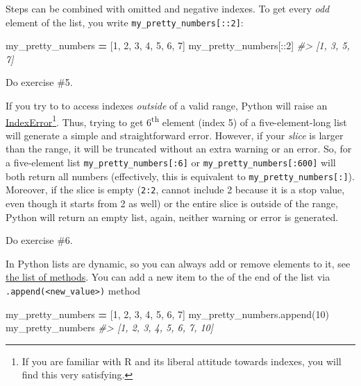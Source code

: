 \documentclass[
]{book}
\newenvironment{Shaded}{\begin{snugshade}}{\end{snugshade}}
\newcommand{\CommentTok}[1]{\textcolor[rgb]{0.56,0.35,0.01}{\textit{#1}}}
\newcommand{\DecValTok}[1]{\textcolor[rgb]{0.00,0.00,0.81}{#1}}
\newcommand{\NormalTok}[1]{#1}
\newcommand{\OperatorTok}[1]{\textcolor[rgb]{0.81,0.36,0.00}{\textbf{#1}}}
\begin{document}
Steps can be combined with omitted and negative indexes. To get every \emph{odd} element of the list, you write \texttt{my\_pretty\_numbers{[}::2{]}}:

\begin{Shaded}
\begin{Highlighting}[]
\NormalTok{my\_pretty\_numbers }\OperatorTok{=}\NormalTok{ [}\DecValTok{1}\NormalTok{, }\DecValTok{2}\NormalTok{, }\DecValTok{3}\NormalTok{, }\DecValTok{4}\NormalTok{, }\DecValTok{5}\NormalTok{, }\DecValTok{6}\NormalTok{, }\DecValTok{7}\NormalTok{]}
\NormalTok{my\_pretty\_numbers[::}\DecValTok{2}\NormalTok{]}
\CommentTok{\#\textgreater{} [1, 3, 5, 7]}
\end{Highlighting}
\end{Shaded}

Do exercise \#5.

If you try to to access indexes \emph{outside} of a valid range, Python will raise an \href{https://docs.python.org/3/library/exceptions.html\#IndexError}{IndexError}\footnote{If you are familiar with R and its liberal attitude towards indexes, you will find this very satisfying.}. Thus, trying to get 6\textsuperscript{th} element (index 5) of a five-element-long list will generate a simple and straightforward error. However, if your \emph{slice} is larger than the range, it will be truncated without an extra warning or an error. So, for a five-element list \texttt{my\_pretty\_numbers{[}:6{]}} or \texttt{my\_pretty\_numbers{[}:600{]}} will both return all numbers (effectively, this is equivalent to \texttt{my\_pretty\_numbers{[}:{]}}). Moreover, if the slice is empty (\texttt{2:2}, cannot include 2 because it is a stop value, even though it starts from 2 as well) or the entire slice is outside of the range, Python will return an empty list, again, neither warning or error is generated.

Do exercise \#6.

In Python lists are dynamic, so you can always add or remove elements to it, see \href{https://docs.python.org/3/tutorial/datastructures.html\#more-on-lists}{the list of methods}. You can add a new item to the of the end of the list via \texttt{.append(\textless{}new\_value\textgreater{})} method

\begin{Shaded}
\begin{Highlighting}[]
\NormalTok{my\_pretty\_numbers }\OperatorTok{=}\NormalTok{ [}\DecValTok{1}\NormalTok{, }\DecValTok{2}\NormalTok{, }\DecValTok{3}\NormalTok{, }\DecValTok{4}\NormalTok{, }\DecValTok{5}\NormalTok{, }\DecValTok{6}\NormalTok{, }\DecValTok{7}\NormalTok{]}
\NormalTok{my\_pretty\_numbers.append(}\DecValTok{10}\NormalTok{)}
\NormalTok{my\_pretty\_numbers}
\CommentTok{\#\textgreater{} [1, 2, 3, 4, 5, 6, 7, 10]}
\end{Highlighting}
\end{Shaded}
\end{document}
